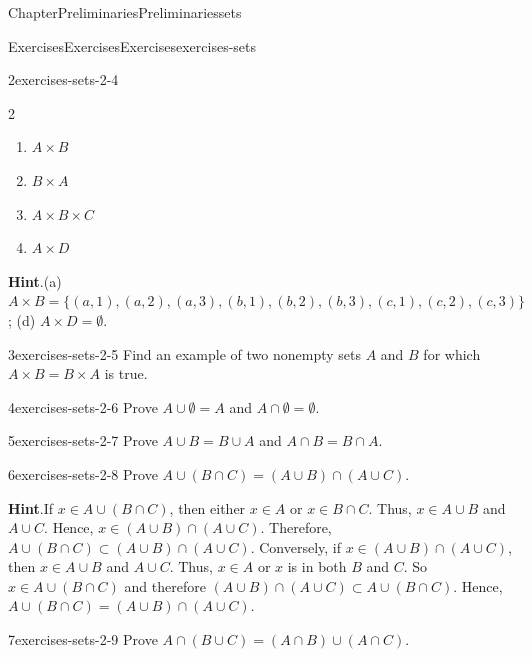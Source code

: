 \documentclass[oneside,10pt,]{book}
\newcommand{\blocktitlefont}{\relax}
\numberwithin{equation}{section}
\begin{document}
\begin{chapterptx}{Chapter}{Preliminaries}{}{Preliminaries}{}{}{sets}
\begin{exercises-section}{Exercises}{Exercises}{}{Exercises}{}{}{exercises-sets}
\begin{divisionexercise}{2}{}{}{exercises-sets-2-4}
\begin{multicols}{2}
\begin{enumerate}[label={(\alph*)}]
\item{}\(\displaystyle A \times B\)%
\item{}\(\displaystyle B \times A\)%
\item{}\(\displaystyle A \times B \times C\)%
\item{}\(\displaystyle A \times D\)%
\end{enumerate}
\end{multicols}
\par\smallskip%
\noindent\textbf{\blocktitlefont Hint}.\hypertarget{exercises-sets-2-4-2}{}\quad{}(a) \(A \times B = \{ (a,1), (a,2), (a,3), (b,1), (b,2), (b,3), (c,1), (c,2), (c,3) \}\); (d) \(A \times D = \emptyset\).%
\end{divisionexercise}%
\begin{divisionexercise}{3}{}{}{exercises-sets-2-5}%
Find an example of two nonempty sets \(A\) and \(B\) for which \(A \times B = B \times A\) is true.%
\end{divisionexercise}%
\begin{divisionexercise}{4}{}{}{exercises-sets-2-6}%
Prove  \(A \cup \emptyset = A\) and \(A \cap \emptyset = \emptyset\).%
\end{divisionexercise}%
\begin{divisionexercise}{5}{}{}{exercises-sets-2-7}%
Prove \(A \cup B = B \cup A\) and \(A \cap B = B \cap A\).%
\end{divisionexercise}%
\begin{divisionexercise}{6}{}{}{exercises-sets-2-8}%
Prove \(A \cup (B \cap C) = (A \cup B) \cap (A \cup C)\).%
\par\smallskip%
\noindent\textbf{\blocktitlefont Hint}.\hypertarget{exercises-sets-2-8-2}{}\quad{}If \(x \in A \cup (B \cap C)\), then either \(x \in A\) or \(x \in B \cap C\).  Thus,   \(x \in A \cup B\) and \(A \cup C\).  Hence, \(x \in (A \cup B) \cap (A \cup C)\). Therefore, \(A \cup (B \cap C) \subset (A \cup B) \cap (A \cup C)\).  Conversely, if \(x \in (A \cup B) \cap (A \cup C)\), then \(x \in A \cup B\) and \(A \cup C\). Thus, \(x \in A\) or \(x\) is in both \(B\) and \(C\). So \(x \in A \cup (B \cap C)\) and therefore \((A \cup B) \cap (A \cup C) \subset A \cup (B \cap C)\). Hence, \(A \cup (B \cap C) = (A \cup B) \cap (A \cup C)\).%
\end{divisionexercise}%
\begin{divisionexercise}{7}{}{}{exercises-sets-2-9}%
Prove \(A \cap (B \cup C) = (A \cap B) \cup (A \cap C)\).%
\end{divisionexercise}%

\end{exercises-section}
\end{chapterptx}
\end{document}
